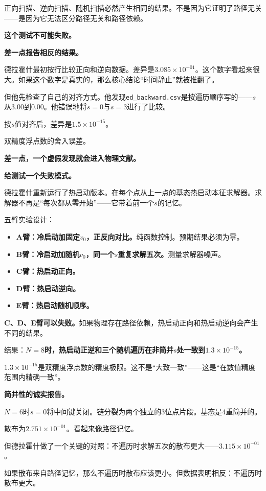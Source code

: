 \documentclass[11pt,a4paper]{book}
\theoremstyle{definition}
\begin{document}
正向扫描、逆向扫描、随机扫描必然产生相同的结果。不是因为它证明了路径无关——是因为它无法区分路径无关和路径依赖。

\textbf{这个测试不可能失败。}

\textbf{差一点报告相反的结果。}

德拉霍什最初按行比较正向和逆向数据。差异是$3.085\times10^{-01}$。这个数字看起来很大。如果这个数字是真实的，那么核心结论“时间静止”就被推翻了。

但他先检查了自己的对齐方式。他发现\texttt{ed\_backward.csv}是按遍历顺序写的——$s$从3.00到0.00。他错误地将$s=0$与$s=3$进行了比较。

按$s$值对齐后，差异是$1.5\times10^{-15}$。

双精度浮点数的舍入误差。

\textbf{差一点，一个虚假发现就会进入物理文献。}

\textbf{给测试一个失败模式。}

德拉霍什重新运行了热启动版本。在每个点从上一点的基态热启动本征求解器。求解器不再是“每次都从零开始”——它带着前一个$s$的记忆。

五臂实验设计：

\begin{itemize}
\item \textbf{A臂：冷启动加固定$v_0$，正反向对比。}纯函数控制。预期结果必须为零。
\item \textbf{B臂：冷启动加随机$v_0$，同一个$s$重复求解五次。}测量求解器噪声。
\item \textbf{C臂：热启动正向。}
\item \textbf{D臂：热启动逆向。}
\item \textbf{E臂：热启动随机顺序。}
\end{itemize}

\textbf{C、D、E臂可以失败。}如果物理存在路径依赖，热启动正向和热启动逆向会产生不同的结果。

结果：\textbf{$N=8$时，热启动正逆和三个随机遍历在非简并$s$处一致到$1.3\times10^{-15}$。}

$1.3\times10^{-15}$是双精度浮点数的精度极限。这不是“大致一致”——这是“在数值精度范围内精确一致”。

\textbf{简并性的诚实报告。}

$N=6$时$s=0$将中间键关闭。链分裂为两个独立的3位点片段。基态是4重简并的。

散布为$2.751\times10^{-01}$。看起来像路径记忆。

但德拉霍什做了一个关键的对照：不遍历时求解五次的散布更大——$3.115\times10^{-01}$。

如果散布来自路径记忆，那么不遍历时散布应该更小。但数据表明相反：不遍历时散布更大。
\end{document}
